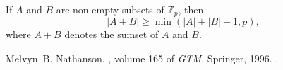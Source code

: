 \documentclass[12pt]{article}
\newcommand*{\abs}[1]{\left\lvert #1\right\rvert}
\newcommand*{\integers}{\ensuremath{{\mathbb{Z}}}}
\begin{document}
If $A$ and $B$ are non-empty subsets of $\integers_p$, then
\begin{equation*}
\abs{A+B}\geq \min(\abs{A}+\abs{B}-1, p),
\end{equation*}
where $A+B$ denotes the sumset of $A$ and $B$.

\begin{thebibliography}{1}

Melvyn~B. Nathanson.
, volume 165 of {\em GTM}.
\newblock Springer, 1996.
\newblock {}.


\end{thebibliography}

\end{document}
